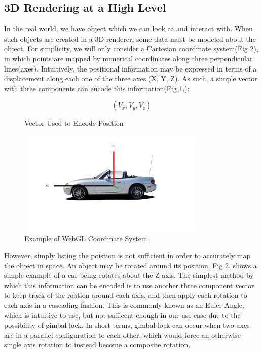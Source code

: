 \documentclass[conference]{IEEEtran}
\begin{document}
\subsection{3D Rendering at a High Level}

In the real world, we have object which we can look at and interact with. When such objects are created in a 3D renderer,
some data must be modeled about the object. For simplicity, we will only consider a Cartesian coordinate system(Fig 2), in which points are mapped 
by numerical coordinates along three perpendicular lines(axes). Intuitively, the positional information may be expressed in terms of a displacement 
along each one of the three axes (X, Y, Z). As such, a simple vector with three components can encode this information(Fig 1.): 

\begin{figure}[htbp]
\[ (V_{x}, V_{y}, V_{z}) \]
\caption{Vector Used to Encode Position}
\end{figure}

\begin{figure}[htbp]
\centerline{\includegraphics [width = 9cm, height = 5cm] {fig1.png}}
\caption{Example of WebGL Coordinate System}
\end{figure}

However, simply listing the poistion is not sufficient in order to accurately map the object in space. An object may be rotated 
around its position. Fig 2. shows a simple example of a car being rotates about the Z axis. The simplest method by which this information can be encoded 
is to use another three component vector to keep track of the roation around each axis, and then apply each rotation to each axis in a cascading fashion. 
This is commonly known as an Euler Angle, which is intuitive to use, but not sufficent enough in our use case due to the possibility of gimbal lock. 
In short terms, gimbal lock can occur when two axes are in a parallel configuration to each other, which would force an otherwise single axis rotation to instead 
become a composite rotation. 
\end{document}
